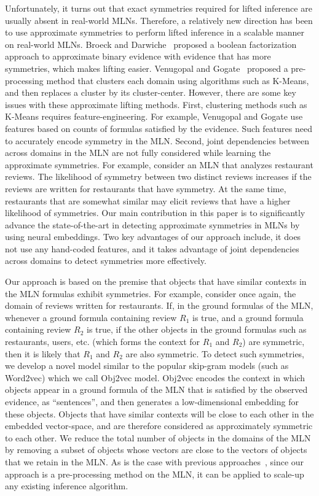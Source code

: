 Unfortunately, it turns out that exact symmetries required for lifted inference are usually absent in real-world MLNs. Therefore, a relatively new direction has been to use approximate symmetries to perform lifted inference in a scalable manner on real-world MLNs. Broeck and Darwiche~\cite{broeck&darwiche13} proposed a boolean factorization approach to approximate binary evidence with evidence that has more symmetries, which makes lifting easier. Venugopal and Gogate~\cite{venugopal&gogate14} proposed a pre-processing method that clusters each domain using algorithms such as K-Means, and then replaces a cluster by its cluster-center. However, there are some key issues with these approximate lifting methods. First, clustering methods such as K-Means requires feature-engineering. For example, Venugopal and Gogate use features based on counts of formulas satisfied by the evidence. Such features need to accurately encode symmetry in the MLN. Second, joint dependencies between across domains in the MLN are not fully considered while learning the approximate symmetries. For example, consider an MLN that analyzes restaurant reviews. The likelihood of symmetry between two distinct reviews increases if the reviews are written for restaurants that have symmetry. At the same time,  restaurants that are somewhat similar may elicit reviews that have a higher likelihood of symmetries. Our main contribution in this paper is to significantly advance the state-of-the-art in detecting approximate symmetries in MLNs by using neural embeddings. Two key advantages of our approach include, it does not use any hand-coded features, and it takes advantage of joint dependencies across domains to detect symmetries more effectively.

Our approach is based on the premise that objects that have similar contexts in the MLN formulas exhibit symmetries. For example, consider once again, the domain of reviews written for restaurants. If, in the ground formulas of the MLN, whenever a ground formula containing review $R_1$ is true, and a ground formula containing review $R_2$ is true, if the other objects in the ground formulas such as restaurants, users, etc. (which forms the context for $R_1$ and $R_2$) are symmetric, then it is likely that $R_1$ and $R_2$ are also symmetric. To detect such symmetries, we develop a novel model similar to the popular skip-gram models (such as Word2vec) which we call Obj2vec model. Obj2vec encodes the context in which objects appear in a ground formula of the MLN that is satisfied by the observed evidence, as ``sentences'', and then generates a low-dimensional embedding for these objects. Objects that have similar contexts will be close to each other in the embedded vector-space, and are therefore considered as approximately symmetric to each other. We reduce the total number of objects in the domains of the MLN by removing a subset of objects whose vectors are close to the vectors of objects that we retain in the MLN. As is the case with previous approaches~\cite{broeck&darwiche13,venugopal&gogate14}, since our approach is a pre-processing method on the MLN, it can be applied to scale-up any existing inference algorithm.


